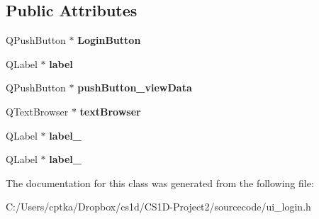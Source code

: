 \subsection*{Public Attributes}
\begin{DoxyCompactItemize}
\item 
\mbox{\label{class_ui__login_ac07cd85b50948adc854e0d73799c1dd8}} 
Q\+Push\+Button $\ast$ {\bfseries Login\+Button}
\item 
\mbox{\label{class_ui__login_a4c0d02992de5f164908ec9c0212fce9e}} 
Q\+Label $\ast$ {\bfseries label}
\item 
\mbox{\label{class_ui__login_ab63f926716a6fa60be3dee19da9ebb53}} 
Q\+Push\+Button $\ast$ {\bfseries push\+Button\+\_\+view\+Data}
\item 
\mbox{\label{class_ui__login_af7aec2853ffa3ebfa9c0898c203c5da9}} 
Q\+Text\+Browser $\ast$ {\bfseries text\+Browser}
\item 
\mbox{\label{class_ui__login_aafa8b63c8fb67dbe235558b4eb0a4d1b}} 
Q\+Label $\ast$ {\bfseries label\+\_}
\item 
\mbox{\label{class_ui__login_a9dd6304aaa11bf305644656b13163538}} 
Q\+Label $\ast$ {\bfseries label\+\_}
\end{DoxyCompactItemize}


The documentation for this class was generated from the following file\+:\begin{DoxyCompactItemize}
\item 
C\+:/\+Users/cptka/\+Dropbox/cs1d/\+C\+S1\+D-\/\+Project2/sourcecode/ui\+\_\+login.\+h\end{DoxyCompactItemize}
